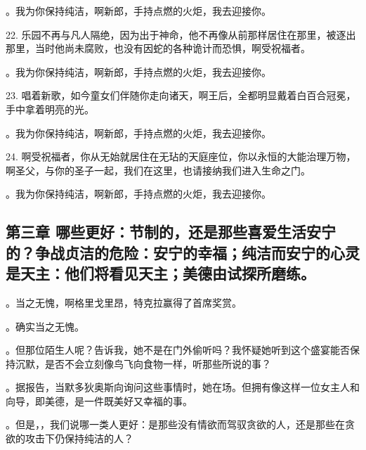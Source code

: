  。我为你保持纯洁，啊新郎，手持点燃的火炬，我去迎接你。\par

 22. 乐园不再与凡人隔绝，因为出于神命，他不再像从前那样居住在那里，被逐出那里，当时他尚未腐败，也没有因蛇的各种诡计而恐惧，啊受祝福者。\par

 。我为你保持纯洁，啊新郎，手持点燃的火炬，我去迎接你。\par

 23. 唱着新歌，如今童女们伴随你走向诸天，啊王后，全都明显戴着白百合冠冕，手中拿着明亮的光。\par

 。我为你保持纯洁，啊新郎，手持点燃的火炬，我去迎接你。\par

 24. 啊受祝福者，你从无始就居住在无玷的天庭座位，你以永恒的大能治理万物，啊圣父，与你的圣子一起，我们在这里，也请接纳我们进入生命之门。\par

 。我为你保持纯洁，啊新郎，手持点燃的火炬，我去迎接你。\par


\subsection{第三章 哪些更好：节制的，还是那些喜爱生活安宁的？争战贞洁的危险：安宁的幸福；纯洁而安宁的心灵是天主：他们将看见天主；美德由试探所磨练。}

 。当之无愧，啊格里戈里昂，特克拉赢得了首席奖赏。\par

 。确实当之无愧。\par

 。但那位陌生人呢？告诉我，她不是在门外偷听吗？我怀疑她听到这个盛宴能否保持沉默，是否不会立刻像鸟飞向食物一样，听那些所说的事？\par

 。据报告，当默多狄奥斯向询问这些事情时，她在场。但拥有像这样一位女主人和向导，即美德，是一件既美好又幸福的事。\par

。但是，，我们说哪一类人更好：是那些没有情欲而驾驭贪欲的人，还是那些在贪欲的攻击下仍保持纯洁的人？\par

